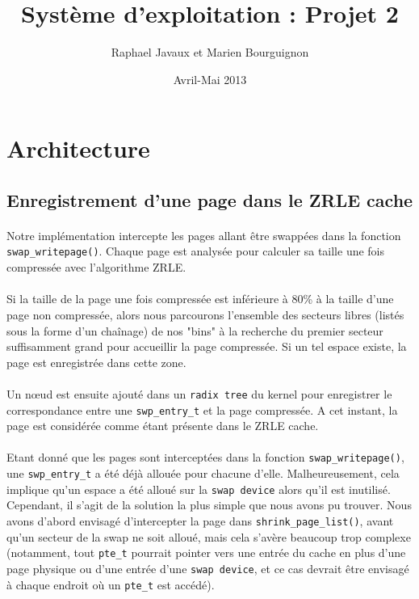 \documentclass[a4paper]{article}
\title{Système d'exploitation : Projet 2}
\author{Raphael Javaux et Marien Bourguignon}
\date{Avril-Mai 2013}
\begin{document}
\maketitle

\section{Architecture}

 \subsection{Enregistrement d'une page dans le ZRLE cache}

    \paragraph{}Notre implémentation intercepte les pages allant être swappées
dans la fonction \texttt{swap\_writepage()}. Chaque page est analysée pour
calculer sa taille une fois compressée avec l'algorithme ZRLE.

    \paragraph{}Si la taille de la page une fois compressée est inférieure à
80\% à la taille d'une page non compressée, alors nous parcourons l'ensemble
des secteurs libres (listés sous la forme d'un chaînage) de nos "bins" à la
recherche du premier secteur suffisamment grand pour accueillir la page
compressée. Si un tel espace existe, la page est enregistrée dans cette zone.

    \paragraph{}Un nœud est ensuite ajouté dans un \texttt{radix tree} du
kernel pour enregistrer le correspondance entre une \texttt{swp\_entry\_t} et
la page compressée. A cet instant, la page est considérée comme étant présente
dans le ZRLE cache.

    \paragraph{}Etant donné que les pages sont interceptées dans la fonction
\texttt{swap\_writepage()}, une \texttt{swp\_entry\_t} a été déjà allouée pour
chacune d'elle. Malheureusement, cela implique qu'un espace a été alloué sur
la \texttt{swap device} alors qu'il est inutilisé. Cependant, il s'agit de la
solution la plus simple que nous avons pu trouver. Nous avons d'abord envisagé
d'intercepter la page dans \texttt{shrink\_page\_list()}, avant qu'un secteur
de la swap ne soit alloué, mais cela s'avère beaucoup trop complexe (notamment,
tout \texttt{pte\_t} pourrait pointer vers une entrée du cache en plus d'une page
physique ou d'une entrée d'une \texttt{swap device}, et ce cas devrait être
envisagé à chaque endroit où un \texttt{pte\_t} est accédé).
\end{document}
